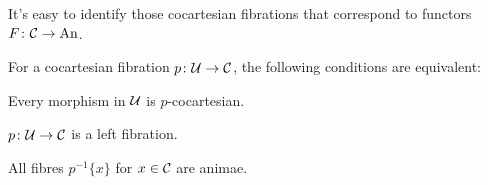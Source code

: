 It's easy to identify those cocartesian fibrations that correspond to functors $F\colon \mathcal{C}\rightarrow \mathrm{An}$.
\begin{lem}\label{lem:CocartesianLeft}
	For a cocartesian fibration $p\colon \mathcal{U}\rightarrow\mathcal{C}$, the following conditions are equivalent:
	\begin{alphanumerate}
		\item Every morphism in $\mathcal{U}$ is $p$-cocartesian.\label{enum:EveryMorphismCocartesian}
		\item $p\colon \mathcal{U}\rightarrow \mathcal{C}$ is a left fibration.\label{enum:CocartesianLeft}
		\item All fibres $p^{-1}\{x\}$ for $x\in\mathcal{C}$ are animae.\label{enum:FibresAreAnimae}
	\end{alphanumerate}
\end{lem}
